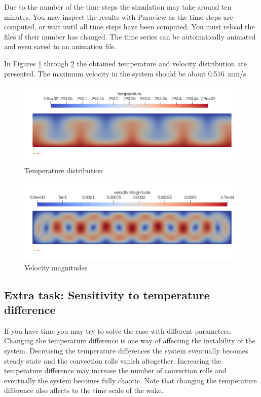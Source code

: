 Due to the number of the time steps the simulation may take around ten minutes.
You may inspect the results with Paraview as the time steps are computed, or
wait until all time steps have been computed. You must reload the files if their number has changed. 
The time series can be automatically animated and even saved to an animation file.

In Figures \ref{fg:rb_temp}  through \ref{fg:rb_velo} the obtained temperature 
and  velocity distribution are presented.  The maximum velocity in the system 
should be about 0.516~mm/s. 

\begin{figure}[h]
\centering
\includegraphics[width=150mm]{rb_temp}
\caption{Temperature distribution}\label{fg:rb_temp}
\end{figure} 

\begin{figure}[h]
\centering
\includegraphics[width=150mm]{rb_velo}
\caption{Velocity magnitudes}\label{fg:rb_velo}
\end{figure} 


\newpage

\subsection*{Extra task: Sensitivity to temperature difference}

If you have time you may try to solve the case with different parameters. Changing the temperature difference
is one way of affecting the instability of the system. Decreasing the temperature differences the system eventually becomes 
steady state and the convection rolls vanish altogether. Increasing the temperature difference may increase the 
number of convection rolls and eventually the system becomes fully chaotic. 
Note that changing the temperature difference also affects to the time scale of the wake. 

\hfill
